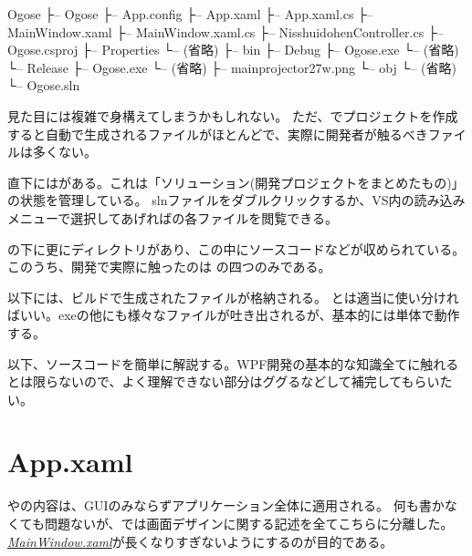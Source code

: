\documentclass[letterpaper,10pt,dvipdfmx]{sphinxmanual}
\begin{document}
\begin{sphinxVerbatim}[commandchars=\\\{\}]
Ogose
├-- Ogose
\textbar{}   ├-- App.config
\textbar{}   ├-- App.xaml
\textbar{}   ├-- App.xaml.cs
\textbar{}   ├-- MainWindow.xaml
\textbar{}   ├-- MainWindow.xaml.cs
\textbar{}   ├-- NisshuidohenController.cs
\textbar{}   ├-- Ogose.csproj
\textbar{}   ├-- Properties
\textbar{}   \textbar{}   └-- (省略)
\textbar{}   ├-- bin
\textbar{}   \textbar{}   ├-- Debug
\textbar{}   \textbar{}   \textbar{}   ├-- Ogose.exe
\textbar{}   \textbar{}   \textbar{}   └-- (省略)
\textbar{}   \textbar{}   └-- Release
\textbar{}   \textbar{}       ├-- Ogose.exe
\textbar{}   \textbar{}       └-- (省略)
\textbar{}   ├-- main\PYGZus{}projector\PYGZus{}27\PYGZus{}w.png
\textbar{}   └-- obj
\textbar{}       └-- (省略)
└-- Ogose.sln
\end{sphinxVerbatim}

見た目には複雑で身構えてしまうかもしれない。
ただ、でプロジェクトを作成すると自動で生成されるファイルがほとんどで、実際に開発者が触るべきファイルは多くない。

直下にはがある。これは「ソリューション(開発プロジェクトをまとめたもの)」の状態を管理している。
slnファイルをダブルクリックするか、VS内の読み込みメニューで選択してあげればの各ファイルを閲覧できる。

の下に更にディレクトリがあり、この中にソースコードなどが収められている。
このうち、開発で実際に触ったのは   の四つのみである。

以下には、ビルドで生成されたファイルが格納される。
とは適当に使い分ければいい。exeの他にも様々なファイルが吐き出されるが、基本的には単体で動作する。

以下、ソースコードを簡単に解説する。WPF開発の基本的な知識全てに触れるとは限らないので、よく理解できない部分はググるなどして補完してもらいたい。


\section{App.xaml}
\label{\detokenize{nissyu-idohen/pc-software-code:app-xaml}}
やの内容は、GUIのみならずアプリケーション全体に適用される。
何も書かなくても問題ないが、では画面デザインに関する記述を全てこちらに分離した。{\hyperref[\detokenize{nissyu-idohen/pc-software-code:mainwindow-xaml}]{\emph{MainWindow.xaml}}}が長くなりすぎないようにするのが目的である。
\end{document}
